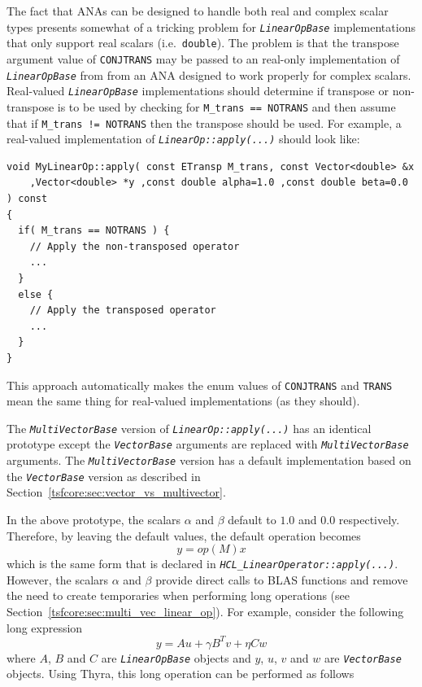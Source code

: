 \documentclass[pdf,ps2pdf,11pt]{SANDreport}
\begin{document}
The fact that ANAs can be designed to handle both real and complex
scalar types presents somewhat of a tricking problem for
{}\texttt{\textit{Linear\-Op\-Base}} implementations that only support real
scalars (i.e.~{}\texttt{double}).  The problem is that the transpose
argument value of {}\texttt{CONJTRANS} may be passed to an real-only
implementation of {}\texttt{\textit{Linear\-Op\-Base}} from from an ANA
designed to work properly for complex scalars.  Real-valued
{}\texttt{\textit{Linear\-Op\-Base}} implementations should determine if
transpose or non-transpose is to be used by checking for
{}\texttt{M\_trans == NOTRANS} and then assume that if
{}\texttt{M\_trans != NOTRANS} then the transpose should be used.  For
example, a real-valued implementation of
{}\texttt{\textit{LinearOp\-::apply(\-...)}} should look like:

{\scriptsize\begin{verbatim}
void MyLinearOp::apply( const ETransp M_trans, const Vector<double> &x
    ,Vector<double> *y ,const double alpha=1.0 ,const double beta=0.0 ) const
{
  if( M_trans == NOTRANS ) {
    // Apply the non-transposed operator
    ...
  }
  else {
    // Apply the transposed operator
    ...
  }
}
\end{verbatim}}



This approach automatically makes the enum values of
{}\texttt{CONJTRANS} and {}\texttt{TRANS} mean the same thing for
real-valued implementations (as they should).

The {}\texttt{\textit{Multi\-Vector\-Base}} version of
{}\texttt{\textit{LinearOp\-::apply(\-...)}} has an identical prototype except
the {}\texttt{\textit{Vector\-Base}} arguments are replaced with
{}\texttt{\textit{Multi\-Vector\-Base}} arguments.  The
{}\texttt{\textit{Multi\-Vector\-Base}} version has a default implementation
based on the {}\texttt{\textit{Vector\-Base}} version as described in
Section~\ref{tsfcore:sec:vector_vs_multivector}.

In the above prototype, the scalars $\alpha$ and $\beta$ default to
$1.0$ and $0.0$ respectively.  Therefore, by leaving the default
values, the default operation becomes
%
\[
y = op(M) x
\]
%
which is the same form that is declared in
{}\texttt{\textit{HCL\-\_Linear\-Operator\-::apply(\-...)}}.  However, the
scalars $\alpha$ and $\beta$ provide direct calls to BLAS functions and remove
the need to create temporaries when performing long operations (see
Section~\ref{tsfcore:sec:multi_vec_linear_op}).  For example, consider the
following long expression
%
\[
y = A u + \gamma B^T v + \eta C w
\]
%
where $A$, $B$ and $C$ are {}\texttt{\textit{Linear\-Op\-Base}} objects and
$y$, $u$, $v$ and $w$ are {}\texttt{\textit{Vector\-Base}} objects.  Using
Thyra, this long operation can be performed as follows
\end{document}
